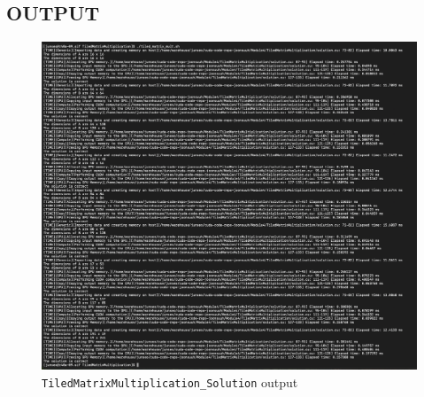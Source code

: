 \documentclass[../main.tex]{subfiles}
\begin{document}
\newpage

\subsection*{OUTPUT}
\begin{figure}
    [ht]
    \centering
    \includegraphics[width=\textwidth]{tiledMatrixMult.png}
    \caption{\texttt{TiledMatrixMultiplication\_Solution} output}
\end{figure}
\end{document}
